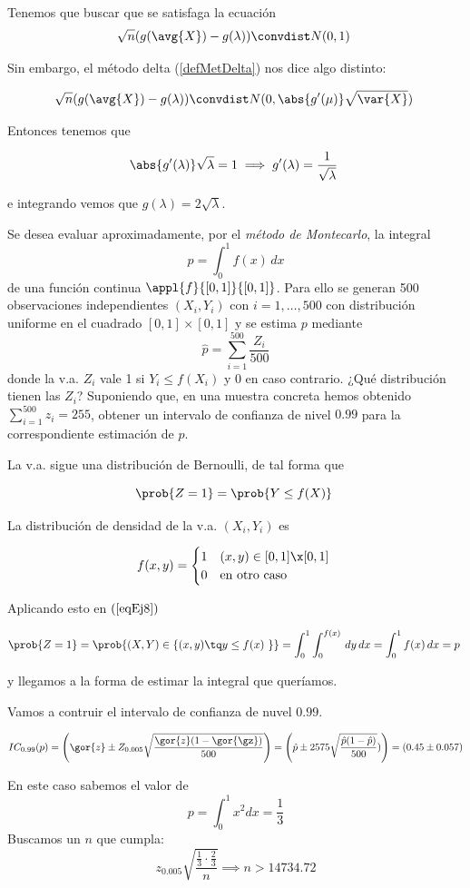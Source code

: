 \begin{problem}[7]
\spart Tenemos que buscar que se satisfaga la ecuación \[ \sqrt{n}(g(\avg{X}) - g(\lambda))\convdist N(0,1) \]

Sin embargo, el método delta (\ref{defMetDelta}) nos dice algo distinto:

\[ \sqrt{n}(g(\avg{X}) - g(\lambda))\convdist N(0,\abs{g'(\mu)}\sqrt{\var{X}}) \]

Entonces tenemos que 

\[ \abs{g'(\lambda)}\sqrt{\lambda} = 1 \implies g'(\lambda) = \frac{1}{\sqrt{\lambda}} \]

e integrando vemos que $g(\lambda) = 2\sqrt{\lambda} $.
\end{problem}

\begin{problem}[8]
\ppart Se desea evaluar aproximadamente, por el \textit{método de Montecarlo}, la integral 
\[ p = \int_0^1f(x)\,dx \] 
de una función continua $\appl{f}{[0,1]}{[0,1]}$. Para ello se generan 500 observaciones independientes $(X_i,Y_i)$ con $i=1,\dotsc,500$ con distribución uniforme en el cuadrado $[0,1]×[0,1]$ y se estima $p$ mediante
\[ \hat{p} = \sum_{i=1}^{500} \frac{Z_i}{500} \]
donde la v.a. $Z_i$ vale 1 si $Y_i \leq f(X_i)$ y $0$ en caso contrario. ¿Qué distribución tienen las $Z_i$? Suponiendo que, en una muestra concreta hemos obtenido $\sum_{i=1}^{500} z_i = 255$, obtener un intervalo de confianza de nivel $0.99$ para la correspondiente estimación de $p$.

\solution
\spart La v.a. sigue una distribución de Bernoulli, de tal forma que

\begin{equation} \prob{Z=1}=\prob{Y \leq f(X)} \label{eqEj8} \end{equation}

La distribución de densidad de la v.a. $(X_i, Y_i)$ es 

\[
f(x,y) = \begin{cases}
1 & (x,y) \in [0,1] \x [0,1] \\
0 & \text{en otro caso}
\end{cases}
\]

Aplicando esto en $(\ref{eqEj8})$

\[ \prob{Z=1} = \prob{(X,Y) \in \{(x,y)\tq y \leq f(x) \}} = \int_0^1\int_0^{f(x)} \,dy\,dx = \int_0^1f(x)\,dx = p \]

y llegamos a la forma de estimar la integral que queríamos. 

Vamos a contruir el intervalo de confianza de nuvel $0.99$.

\[IC_{0.99} (p) = \left(\gor{z} \pm Z_{0.005}\sqrt{\frac{\gor{z}(1-\gor{\gz})}{500}}\right) = \left(\hat{p} \pm 2575 \sqrt{\frac{\hat{p}(1-\hat{p})}{500}}) \right) = (0.45\pm 0.057)\]


\spart En este caso sabemos el valor de \[p = \int_0^1 x^2dx = \frac{1}{3}\]
Buscamos un $n$ que cumpla: \[z_{0.005} \sqrt{\frac{\frac{1}{3}\cdot\frac{2}{3}}{n}} \implies n > 14734.72\]

\end{problem}


